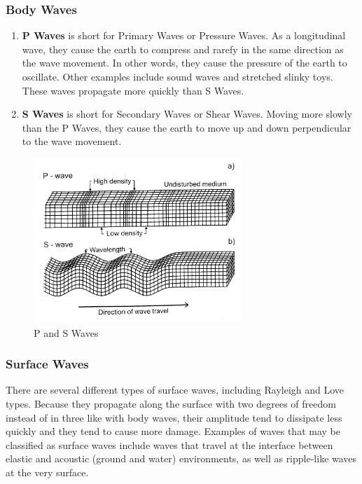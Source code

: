 \subsubsection{Body Waves}

\begin{enumerate}[leftmargin=0.5in]
	\item{\textbf{P Waves}} is short for Primary Waves or Pressure Waves. As a longitudinal wave, they cause the earth to compress and rarefy in the same direction as the wave movement. In other words, they cause the pressure of the earth to oscillate. Other examples include sound waves and stretched slinky toys. These waves propagate more quickly than S Waves.
	
	\item{\textbf{S Waves}} is short for Secondary Waves or Shear Waves. Moving more slowly than the P Waves, they cause the earth to move up and down perpendicular to the wave movement.
\end{enumerate}

\begin{figure}[ht]
	\centering
	\includegraphics[width=0.7\textwidth]{Images/waves.jpg}
	\caption{P and S Waves}
	\label{fig:PSWaves}
\end{figure}

\subsubsection{Surface Waves}

There are several different types of surface waves, including Rayleigh and Love types. Because they propagate along the surface with two degrees of freedom instead of in three like with body waves, their amplitude tend to dissipate less quickly and they tend to cause more damage. Examples of waves that may be classified as surface waves include waves that travel at the interface between elastic and acoustic (ground and water) environments, as well as ripple-like waves at the very surface.

